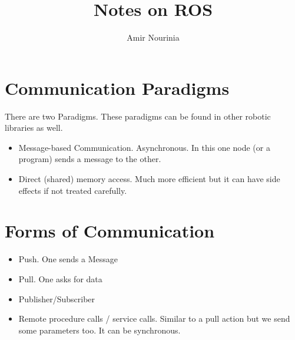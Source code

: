 \documentclass[]{report}
\title{Notes on ROS}
\author{Amir Nourinia}
\begin{document}
\maketitle
\section{Communication Paradigms}
    There are two Paradigms. These paradigms can be found in other robotic libraries as well.
    \begin{itemize}
        \item Message-based Communication. Asynchronous. In this one node (or a program) sends a message to the other.
        \item Direct (shared) memory access. Much more efficient but it can have side effects if not treated carefully.
    \end{itemize}
\section*{Forms of Communication}
    \begin{itemize}
        \item Push. One sends a Message
        \item Pull. One asks for data
        \item Publisher/Subscriber
        \item Remote procedure calls / service calls. Similar to a pull action but we send some parameters too. It can be synchronous.
    \end{itemize}
\end{document}
